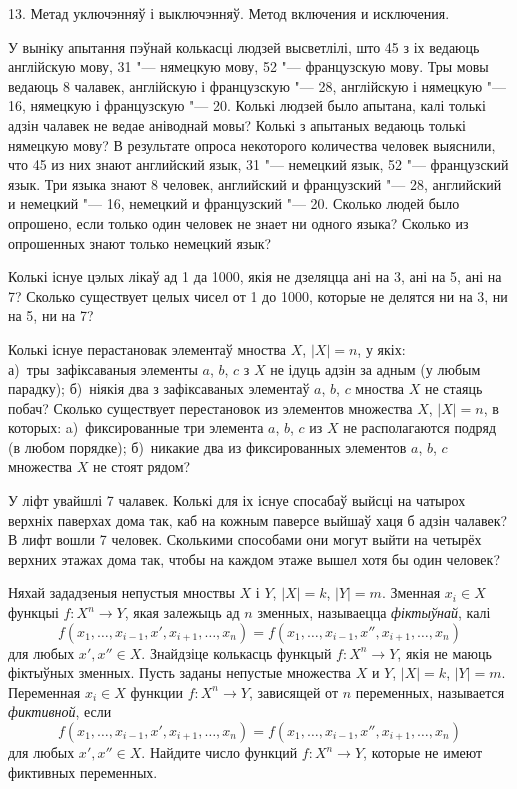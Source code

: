 \documentclass[12pt, a4paper]{article}
\begin{document}
\biLangHeader
{13. Метад уключэнняў і выключэнняў.}
{Метод включения и исключения.}

\begin{problemList}

\problemItemSimple
{У выніку апытання пэўнай колькасці людзей высветлілі, што 45 з іх
ведаюць англійскую мову, 31 "--- нямецкую мову, 52 "--- французскую мову.
Тры мовы ведаюць 8 чалавек, англійскую і французскую "--- 28, англійскую і нямецкую "--- 16,
нямецкую і французскую "--- 20. Колькі людзей было апытана, калі толькі адзін чалавек не ведае
аніводнай мовы? Колькі з апытаных ведаюць толькі нямецкую мову?}
{В результате опроса некоторого количества человек выяснили, что 45
из них знают английский язык, 31 "--- немецкий язык, 52 "--- французский язык.
Три языка знают 8 человек, английский и французский "--- 28, английский и
немецкий "--- 16, немецкий и французский "--- 20. Сколько людей было опрошено,
если только один человек не знает ни одного языка? Сколько из опрошенных
знают только немецкий язык?}

\bigskip

\problemItemSimple
{Колькі існуе цэлых лікаў ад 1 да 1000, якія не дзеляцца ані на 3, ані на 5, ані на 7?}
{Сколько существует целых чисел от 1 до 1000, которые не делятся ни
на 3, ни на 5, ни на 7?}

\bigskip

\problemItemSimple
{Колькі існуе перастановак элементаў мноства $X$, $|X| = n$, у якіх:
а)~тры~зафіксаваныя элементы $a$, $b$, $c$ з $X$ не ідуць адзін за адным (у любым парадку);
б)~ніякія два з зафіксаваных элементаў $a$, $b$, $c$ мноства $X$ не стаяць побач?}
{Сколько существует перестановок из элементов множества $X$, $|X| = n$,
в которых: a)~фиксированные три элемента $a$, $b$, $c$ из $X$ не располагаются
подряд (в любом порядке); б)~никакие два из фиксированных элементов $a$, $b$, $c$
множества $X$ не стоят рядом?}

\bigskip

\problemItemSimple
{У ліфт увайшлі 7 чалавек. Колькі для іх існуе спосабаў выйсці на чатырох верхніх паверхах дома так,
каб на кожным паверсе выйшаў хаця б адзін чалавек?}
{В лифт вошли 7 человек. Сколькими способами они могут выйти на четырёх
верхних этажах дома так, чтобы на каждом этаже вышел хотя бы один человек?}

\bigskip

\problemItemSimple
{Няхай зададзеныя непустыя мноствы $X$ і $Y$, $|X| = k$, $|Y| = m$.
Зменная $x_i \in X$ функцыі $f\colon X^n \to Y$, якая залежыць ад $n$ зменных,
называецца \emph{фіктыўнай}, калі $$f(x_1, \ldots, x_{i - 1}, x', x_{i + 1}, \ldots, x_n) =
f(x_1, \ldots, x_{i - 1}, x'', x_{i + 1}, \ldots, x_n)$$ для любых $x', x'' \in X$.
Знайдзіце колькасць функцый $f\colon X^n \to Y$, якія не маюць фіктыўных зменных.}
{Пусть заданы непустые множества $X$ и $Y$, $|X| = k$, $|Y| = m$.
Переменная $x_i \in X$ функции $f\colon X^n \to Y$, зависящей от $n$ переменных,
называется \emph{фиктивной}, если $$f(x_1, \ldots, x_{i - 1}, x', x_{i + 1}, \ldots, x_n) =
f(x_1, \ldots, x_{i - 1}, x'', x_{i + 1}, \ldots, x_n)$$ для любых $x', x'' \in X$.
Найдите число функций $f\colon X^n \to Y$, которые не имеют фиктивных переменных.}


\end{problemList}
\end{document}
